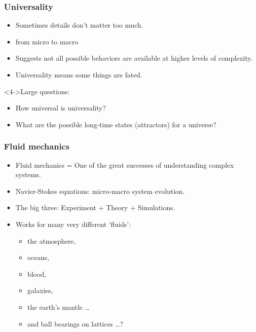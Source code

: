 \begin{frame}
  \frametitle{Universality}

  \begin{block}{}
    \begin{itemize}
    \item<+-> 
      Sometimes \alert{details don't matter too much}.
    \item<+-> 
       from micro to macro
    \item<+-> 
      Suggests not all possible behaviors are available 
      \qquad at higher levels of complexity.
    \item<+-> 
      Universality means some things are fated.
    \end{itemize}
  \end{block}

  \begin{block}<4->{Large questions:}
    \begin{itemize}
    \item<5->
      How universal is universality?
    \item<6->
      What are the possible long-time states (attractors) for a universe?
    \end{itemize}
  \end{block}
    

\end{frame}


\begin{frame}
  \frametitle{Fluid mechanics}

  \begin{block}{}
  \begin{itemize}
  \item<+-> 
    Fluid mechanics = One of the great successes of 
    understanding complex systems.
  \item<+-> 
    Navier-Stokes equations: micro-macro system evolution.
  \item<+-> 
    The big three: Experiment + Theory + Simulations.
  \item<+-> 
    Works for many very different `fluids':
    \begin{itemize}
    \item 
      the atmosphere,
    \item 
      oceans,
    \item 
      blood,
    \item 
      galaxies,
    \item 
      the earth's mantle \ldots
    \item<+->
      \alert{and ball bearings on lattices \ldots ?}
    \end{itemize}
  \end{itemize}
  \end{block}

\end{frame}


